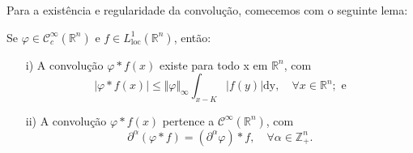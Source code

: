 \documentclass[../distribution_theory_notes.tex]{subfiles}
\begin{document}
  Para a existência e regularidade da convolução, comecemos com o seguinte lema: 
 \begin{lemma*}
   Se \(\varphi \in \mathcal{C}_{c}^{\infty}(\mathbb{R}^{n})\) e \(f\in L_{\mathrm{loc}}^{1}(\mathbb{R}^{n})\), então: 
  \begin{itemize}
    \item[i)] A convolução \(\varphi * f(x)\) existe para todo x em \(\mathbb{R}^{n}\), com 
      \[
        |\varphi *f(x)| \leq \Vert \varphi  \Vert_{\infty} \int_{x-K}^{}|f(y)| \mathrm{dy},\quad \forall x\in \mathbb{R}^{n}; \text{ e}
      \]
      \item[ii)] A convolução \(\varphi *f(x)\) pertence a \(\mathcal{C}^{\infty}(\mathbb{R}^{n})\), com 
        \[
          \partial^{\alpha }(\varphi *f)=(\partial^{\alpha }\varphi )*f,\quad \forall \alpha \in \mathbb{Z}_{+}^{n}.
        \]
  \end{itemize}
 \end{lemma*}
\end{document}

